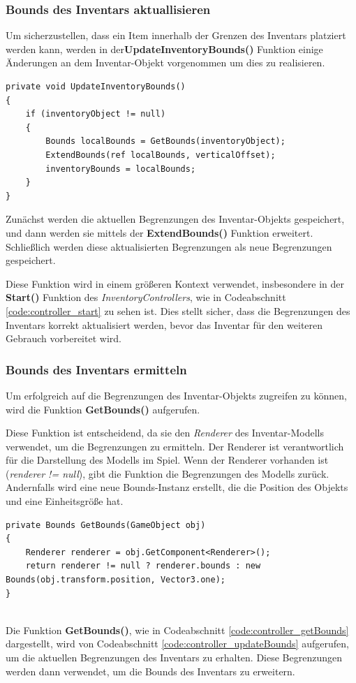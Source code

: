 \subsubsection{Bounds des Inventars aktuallisieren}
Um sicherzustellen, dass ein Item innerhalb der Grenzen des Inventars platziert werden kann, werden in der\textbf{UpdateInventoryBounds()}
Funktion einige Änderungen an dem Inventar-Objekt vorgenommen um dies zu realisieren.
\begin{lstlisting}[style=csharp, caption={Funktion um Inventar Bounds zu erweitern}, label=code:controller_updateBounds]
private void UpdateInventoryBounds()
{
    if (inventoryObject != null)
    {
        Bounds localBounds = GetBounds(inventoryObject);
        ExtendBounds(ref localBounds, verticalOffset);
        inventoryBounds = localBounds;
    }
}
\end{lstlisting}
Zunächst werden die aktuellen Begrenzungen des Inventar-Objekts gespeichert, und dann werden sie mittels der \textbf{ExtendBounds()}
Funktion erweitert. Schließlich werden diese aktualisierten Begrenzungen als neue Begrenzungen gespeichert.

Diese Funktion wird in einem größeren Kontext verwendet, insbesondere in der \textbf{Start()} Funktion des \textit{InventoryControllers},
wie in Codeabschnitt \ref{code:controller_start} zu sehen ist. Dies stellt sicher, dass die Begrenzungen des Inventars
korrekt aktualisiert werden, bevor das Inventar für den weiteren Gebrauch vorbereitet wird.

\subsubsection{Bounds des Inventars ermitteln}
Um erfolgreich auf die Begrenzungen des Inventar-Objekts zugreifen zu können, wird die Funktion \textbf{GetBounds()}
aufgerufen.

Diese Funktion ist entscheidend, da sie den \textit{Renderer} des Inventar-Modells verwendet, um die Begrenzungen zu ermitteln.
Der Renderer ist verantwortlich für die Darstellung des Modells im Spiel. Wenn der Renderer vorhanden ist
(\textit{renderer != null}), gibt die Funktion die Begrenzungen des Modells zurück. Andernfalls wird eine neue Bounds-Instanz
erstellt, die die Position des Objekts und eine Einheitsgröße hat.

\begin{lstlisting}[style=csharp, caption={Funktion um Bounds zu ermitteln}, label=code:controller_getBounds]
private Bounds GetBounds(GameObject obj)
{
    Renderer renderer = obj.GetComponent<Renderer>();
    return renderer != null ? renderer.bounds : new Bounds(obj.transform.position, Vector3.one);
}
\end{lstlisting}\\
Die Funktion \textbf{GetBounds()}, wie in Codeabschnitt \ref{code:controller_getBounds} dargestellt, wird von
Codeabschnitt \ref{code:controller_updateBounds} aufgerufen, um die aktuellen Begrenzungen des Inventars zu erhalten.
Diese Begrenzungen werden dann verwendet, um die Bounds des Inventars zu erweitern.

